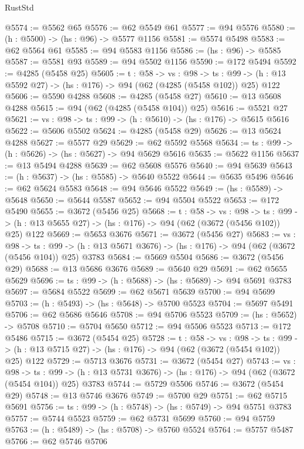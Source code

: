 \begin{lexlean}{RustStd}
\begin{coremodule}
{\begin{coremodule}
{{{{{{{{{@5574 := @5562 @65
@5576 := @62 @5549 @61
@5577 := @94 @5576
@5580 := (h : @5500) -> (hs : @96) -> @5577 @1156
@5581 := @5574 @5498
@5583 := @62 @5564 @61
@5585 := @94 @5583 @1156
@5586 := (hs : @96) -> @5585
@5587 := @5581 @93
@5589 := @94 @5502 @1156
@5590 := @172 @5494
@5592 := @4285 (@5458 @25)
@5605 := {t : @58} ->
  {vs : @98} ->
  {ts : @99} -> (h : @13 @5592 @27) -> (hs : @176) -> @94 (@62 (@4285 (@5458 @102)) @25) @122
@5606 := @5590 @4288
@5608 := @4285 (@5458 @27)
@5610 := @13 @5608 @4288
@5615 := @94 (@62 (@4285 (@5458 @104)) @25)
@5616 := @5521 @27
@5621 := {vs : @98} -> {ts : @99} -> (h : @5610) -> (hs : @176) -> @5615 @5616
@5622 := @5606 @5502
@5624 := @4285 (@5458 @29)
@5626 := @13 @5624 @4288
@5627 := @5577 @29
@5629 := @62 @5592 @5568
@5634 := {ts : @99} -> (h : @5626) -> (hs : @5627) -> @94 @5629 @5616
@5635 := @5622 @1156
@5637 := @13 @5494 @4288
@5639 := @62 @5608 @5576
@5640 := @94 @5639
@5643 := (h : @5637) -> (hs : @5585) -> @5640 @5522
@5644 := @5635 @5496
@5646 := @62 @5624 @5583
@5648 := @94 @5646 @5522
@5649 := (hs : @5589) -> @5648
@5650 := @5644 @5587
@5652 := @94 @5504 @5522
@5653 := @172 @5490
@5655 := @3672 (@5456 @25)
@5668 := {t : @58} ->
  {vs : @98} ->
  {ts : @99} -> (h : @13 @5655 @27) -> (hs : @176) -> @94 (@62 (@3672 (@5456 @102)) @25) @122
@5669 := @5653 @3676
@5671 := @3672 (@5456 @27)
@5683 := {vs : @98} ->
  {ts : @99} -> (h : @13 @5671 @3676) -> (hs : @176) -> @94 (@62 (@3672 (@5456 @104)) @25) @3783
@5684 := @5669 @5504
@5686 := @3672 (@5456 @29)
@5688 := @13 @5686 @3676
@5689 := @5640 @29
@5691 := @62 @5655 @5629
@5696 := {ts : @99} -> (h : @5688) -> (hs : @5689) -> @94 @5691 @3783
@5697 := @5684 @5522
@5699 := @62 @5671 @5639
@5700 := @94 @5699
@5703 := (h : @5493) -> (hs : @5648) -> @5700 @5523
@5704 := @5697 @5491
@5706 := @62 @5686 @5646
@5708 := @94 @5706 @5523
@5709 := (hs : @5652) -> @5708
@5710 := @5704 @5650
@5712 := @94 @5506 @5523
@5713 := @172 @5486
@5715 := @3672 (@5454 @25)
@5728 := {t : @58} ->
  {vs : @98} ->
  {ts : @99} -> (h : @13 @5715 @27) -> (hs : @176) -> @94 (@62 (@3672 (@5454 @102)) @25) @122
@5729 := @5713 @3676
@5731 := @3672 (@5454 @27)
@5743 := {vs : @98} ->
  {ts : @99} -> (h : @13 @5731 @3676) -> (hs : @176) -> @94 (@62 (@3672 (@5454 @104)) @25) @3783
@5744 := @5729 @5506
@5746 := @3672 (@5454 @29)
@5748 := @13 @5746 @3676
@5749 := @5700 @29
@5751 := @62 @5715 @5691
@5756 := {ts : @99} -> (h : @5748) -> (hs : @5749) -> @94 @5751 @3783
@5757 := @5744 @5523
@5759 := @62 @5731 @5699
@5760 := @94 @5759
@5763 := (h : @5489) -> (hs : @5708) -> @5760 @5524
@5764 := @5757 @5487
@5766 := @62 @5746 @5706
}}}}}}}}}
\end{coremodule}}
\end{coremodule}
\end{lexlean}
